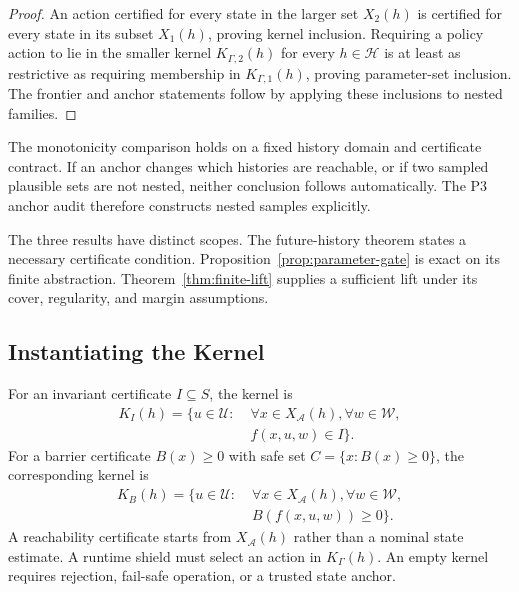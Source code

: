 \begin{proof}
An action certified for every state in the larger set $X_2(h)$ is certified
for every state in its subset $X_1(h)$, proving kernel inclusion.  Requiring a
policy action to lie in the smaller kernel $K_{\Gamma,2}(h)$ for every
$h\in\mathcal H$ is at least as restrictive as requiring membership in
$K_{\Gamma,1}(h)$, proving parameter-set inclusion.  The frontier and anchor
statements follow by applying these inclusions to nested families.
\end{proof}

The monotonicity comparison holds on a fixed history domain and certificate
contract.  If an anchor changes which histories are reachable, or if two
sampled plausible sets are not nested, neither conclusion follows
automatically.  The P3 anchor audit therefore constructs nested samples
explicitly.

The three results have distinct scopes.  The future-history theorem states a
necessary certificate condition.  Proposition~\ref{prop:parameter-gate} is
exact on its finite abstraction.  Theorem~\ref{thm:finite-lift} supplies a
sufficient lift under its cover, regularity, and margin assumptions.

\subsection{Instantiating the Kernel}

For an invariant certificate $I\subseteq S$, the kernel is
\begin{equation}
\begin{aligned}
K_I(h)=\{u\in\mathcal U:\;&\forall x\in X_{\mathcal A}(h),
\forall w\in\mathcal W,\\
& f(x,u,w)\in I\}.
\end{aligned}
\end{equation}
For a barrier certificate $B(x)\ge 0$ with safe set
$C=\{x:B(x)\ge 0\}$, the corresponding kernel is
\begin{equation}
\begin{aligned}
K_B(h)=\{u\in\mathcal U:\;&\forall x\in X_{\mathcal A}(h),
\forall w\in\mathcal W,\\
& B(f(x,u,w))\ge 0\}.
\end{aligned}
\end{equation}
A reachability certificate starts from $X_{\mathcal A}(h)$ rather than a
nominal state estimate.  A runtime shield must select an action in
$K_\Gamma(h)$.  An empty kernel requires rejection, fail-safe operation, or a
trusted state anchor.

